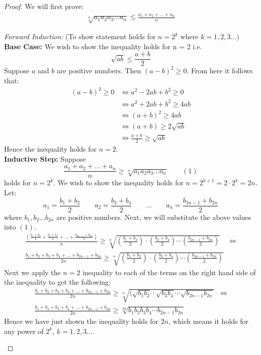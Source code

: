 \documentclass[12pt]{extreport}
\begin{document}
\begin{proof}
We will first prove:
\begin{align*}
\sqrt[n]{a_1 a_2 a_3 ... a_n} \leq \frac{a_1 + a_2 + ... + a_n}{n}
\end{align*}

\begin{flushleft}
\textit{Forward Induction:} (To show statement holds for $n = 2^k$ where $k = 1, 2, 3...$) \\
\textbf{Base Case:} We wish to show the inequality holds for n = 2 i.e. $$\sqrt{ab} \leq \frac{a+b}{2}$$
Suppose $a$ and $b$ are positive numbers. Then $(a-b)^2 \geq 0$. From here it follows that:
\begin{align*}
(a-b)^2 \geq 0 &\iff a^2 - 2ab + b^2 \geq 0 \\
			   &\iff a^2 + 2ab + b^2 \geq 4ab \\
			   &\iff (a+b)^2 \geq 4ab \\
			   &\iff (a+b) \geq 2\sqrt{ab} \\
			   &\iff \frac{a+b}{2} \geq \sqrt{ab}
\end{align*}
Hence the inequality holds for $n=2$.\\
\textbf{Inductive Step:} Suppose $$\frac{a_1 + a_2 + ... + a_n}{n} \geq \sqrt[n]{a_1 a_2 a_3 ... a_n} \qquad (1)$$ holds for $n = 2^k$. We wish to show the inequality holds for $n = 2^{k+1} = 2 \cdot 2^k = 2n$. Let:
$$a_1 = \frac{b_1 + b_2}{2} \qquad a_2 = \frac{b_3 + b_4}{2} \qquad \ldots \qquad a_n = \frac{b_{2n-1} + b_{2n}}{2}$$
where $b_1, b_2 ... b_{2n}$ are positive numbers. Next, we will substitute the above values into $(1)$. 
\begin{align*}
\frac{ (\frac{b_1 + b_2}{2} + \frac{b_3 + b_4}{2} + \ldots + \frac{b_{2n-1} + b_{2n}}{2}) } {n} \geq \sqrt[n]{(\frac{b_1 + b_2}{2})\cdot(\frac{b_3 + b_4}{2})\cdots (\frac{b_{2n-1} + b_{2n}}{2})} &\iff \\
\frac{b_1 + b_2 + b_3 + b_4 + \ldots + b_{2n-1} + b_{2n}}{2n} \geq \sqrt[n]{(\frac{b_1 + b_2}{2}) \cdot (\frac{b_3 + b_4}{2}) \cdots (\frac{b_{2n-1} + b_{2n}}{2})}
\end{align*}
Next we apply the $n=2$ inequality to each of the terms on the right hand side of the inequality to get the following:
\begin{align*}
\frac{b_1 + b_2 + b_3 + b_4 + \ldots + b_{2n-1} + b_{2n}}{2n} \geq \sqrt[n]{(\sqrt{b_1b_2} \cdot \sqrt{b_3b_4} \cdots \sqrt{b_{2n-1}b_{2n}}} &\iff \\
\frac{b_1 + b_2 + b_3 + b_4 + \ldots + b_{2n-1} + b_{2n}}{2n} \geq \sqrt[2n]{b_1b_2b_3b_4 \cdots b_{2n-1}b_{2n}}
\end{align*}
Hence we have just shown the inequality holds for $2n$, which means it holds for any power of $2^k$, $k = 1,2,3...$. 
\end{flushleft}
\end{proof}
\end{document}
